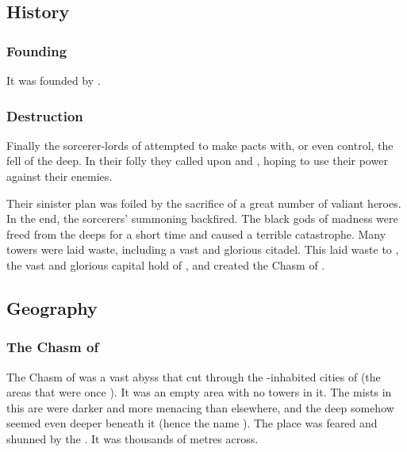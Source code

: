 \subsection{History}





\subsubsection{Founding}
It was founded by .





\subsubsection{Destruction}
Finally the sorcerer-lords of \Tarcharos attempted to make pacts with, or even control, the fell  of the deep. 
In their folly they called upon \Norganthus and \Tzyaragoth, hoping to use their power against their enemies. 

Their sinister plan was foiled by the sacrifice of a great number of valiant heroes.
In the end, the sorcerers' summoning backfired.
The black gods of madness were freed from the deeps for a short time and caused a terrible catastrophe.
Many towers were laid waste, including a vast and glorious citadel. 
This laid waste to \Hyardes, the vast and glorious capital hold of \Tarcharos, and created the Chasm of .









\subsection{Geography}





\subsubsection{The Chasm of \Oggra}
\index{\Oggra}
The Chasm of \Oggra was a vast abyss that cut through the \resphan-inhabited cities of \Nyx (the areas that were once \Merkyrah). 
It was an empty area with no towers in it.
The mists in this are were darker and more menacing than elsewhere, and the deep somehow seemed even deeper beneath it (hence the name ). 
The place was feared and shunned by the \resphain. 
It was thousands of metres across. 






